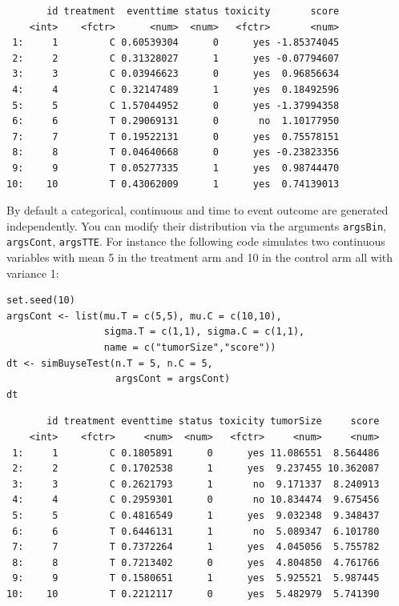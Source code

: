 \documentclass[12pt]{article}
\begin{document}
\begin{verbatim}
       id treatment  eventtime status toxicity       score
    <int>    <fctr>      <num>  <num>   <fctr>       <num>
 1:     1         C 0.60539304      0      yes -1.85374045
 2:     2         C 0.31328027      1      yes -0.07794607
 3:     3         C 0.03946623      0      yes  0.96856634
 4:     4         C 0.32147489      1      yes  0.18492596
 5:     5         C 1.57044952      0      yes -1.37994358
 6:     6         T 0.29069131      0       no  1.10177950
 7:     7         T 0.19522131      0      yes  0.75578151
 8:     8         T 0.04640668      0      yes -0.23823356
 9:     9         T 0.05277335      1      yes  0.98744470
10:    10         T 0.43062009      1      yes  0.74139013
\end{verbatim}

By default a categorical, continuous and time to event outcome are
generated independently. You can modify their distribution via the
arguments \texttt{argsBin}, \texttt{argsCont}, \texttt{argsTTE}. For instance the following
code simulates two continuous variables with mean 5 in the treatment
arm and 10 in the control arm all with variance 1:
\lstset{language=r,label= ,caption= ,captionpos=b,numbers=none}
\begin{lstlisting}
set.seed(10)
argsCont <- list(mu.T = c(5,5), mu.C = c(10,10), 
                 sigma.T = c(1,1), sigma.C = c(1,1),
                 name = c("tumorSize","score"))
dt <- simBuyseTest(n.T = 5, n.C = 5,
                   argsCont = argsCont)
dt
\end{lstlisting}

\begin{verbatim}
       id treatment eventtime status toxicity tumorSize     score
    <int>    <fctr>     <num>  <num>   <fctr>     <num>     <num>
 1:     1         C 0.1805891      0      yes 11.086551  8.564486
 2:     2         C 0.1702538      1      yes  9.237455 10.362087
 3:     3         C 0.2621793      1       no  9.171337  8.240913
 4:     4         C 0.2959301      0       no 10.834474  9.675456
 5:     5         C 0.4816549      1      yes  9.032348  9.348437
 6:     6         T 0.6446131      1       no  5.089347  6.101780
 7:     7         T 0.7372264      1      yes  4.045056  5.755782
 8:     8         T 0.7213402      0      yes  4.804850  4.761766
 9:     9         T 0.1580651      1      yes  5.925521  5.987445
10:    10         T 0.2212117      0      yes  5.482979  5.741390
\end{verbatim}
\end{document}

